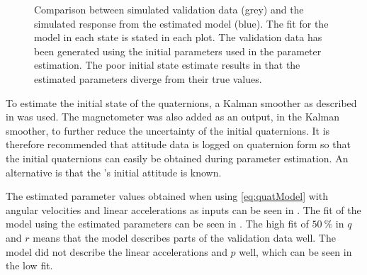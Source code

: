 \begin{figure}[htbp]
  \centering %
  \qquad
  \qquad
    \qquad
    \qquad
    \qquad
  \caption{\label{fig:angVelSim}%
    Comparison between simulated validation data (grey) and the simulated response from the estimated model (blue). The fit for the model in each state is stated in each plot. The validation data has been generated using the initial parameters used in the parameter estimation. The poor initial state estimate results in that the estimated parameters diverge from their true values.}
\end{figure}

To estimate the initial state of the quaternions, a Kalman smoother as described in \citet{Wallin} was used. The magnetometer was also added as an output, in the Kalman smoother, to further reduce the uncertainty of the initial quaternions. It is therefore recommended that attitude data is logged on quaternion form so that the initial quaternions can easily be obtained during parameter estimation. An alternative is that the \abbrROV's initial attitude is known. 

The estimated parameter values obtained when using \eqref{eq:quatModel} with angular velocities and linear accelerations as inputs can be seen in . The fit of the model using the estimated parameters can be seen in . The high fit of $50\ \%$ in $q$ and $r$ means that the model describes parts of the validation data well. The model did not describe the linear accelerations and $p$ well, which can be seen in the low fit.

